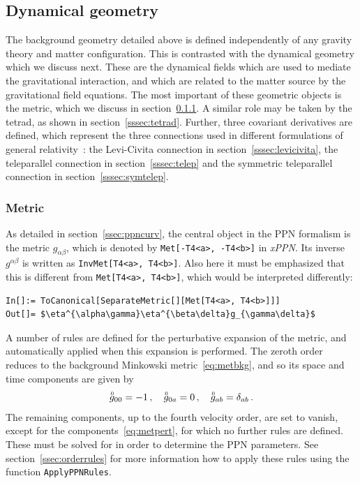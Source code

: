 \documentclass[notitlepage,a4paper,aps,prd,onecolumn,superscriptaddress,nofootinbib,groupedaddress,longbibliography]{revtex4-1}
\newcommand{\order}[2]{\accentset{#2}{#1}}
\newcommand{\xPPN}{\emph{xPPN}}
\begin{document}
\subsection{Dynamical geometry}\label{ssec:dyngeo}
The background geometry detailed above is defined independently of any gravity theory and matter configuration. This is contrasted with the dynamical geometry which we discuss next. These are the dynamical fields which are used to mediate the gravitational interaction, and which are related to the matter source by the gravitational field equations. The most important of these geometric objects is the metric, which we discuss in section~\ref{sssec:metric}. A similar role may be taken by the tetrad, as shown in section~\ref{sssec:tetrad}. Further, three covariant derivatives are defined, which represent the three connections used in different formulations of general relativity~\cite{BeltranJimenez:2019tjy}: the Levi-Civita connection in section~\ref{sssec:levicivita}, the teleparallel connection in section~\ref{sssec:telep} and the symmetric teleparallel connection in section~\ref{sssec:symtelep}.

\subsubsection{Metric}\label{sssec:metric}
As detailed in section~\ref{ssec:ppncurv}, the central object in the PPN formalism is the metric \(g_{\alpha\beta}\), which is denoted by \lstinline/Met[-T4<a>, -T4<b>]/ in \xPPN. Its inverse \(g^{\alpha\beta}\) is written as \lstinline/InvMet[T4<a>, T4<b>]/. Also here it must be emphasized that this is different from \lstinline/Met[T4<a>, T4<b>]/, which would be interpreted differently:
\begin{lstlisting}
In[]:= ToCanonical[SeparateMetric[][Met[T4<a>, T4<b>]]]
Out[]= $\eta^{\alpha\gamma}\eta^{\beta\delta}g_{\gamma\delta}$
\end{lstlisting}
A number of rules are defined for the perturbative expansion of the metric, and automatically applied when this expansion is performed. The zeroth order reduces to the background Minkowski metric~\eqref{eq:metbkg}, and so its space and time components are given by
\begin{equation}
\order{g}{0}_{00} = -1\,, \quad
\order{g}{0}_{0a} = 0\,, \quad
\order{g}{0}_{ab} = \delta_{ab}\,.
\end{equation}
The remaining components, up to the fourth velocity order, are set to vanish, except for the components~\eqref{eq:metpert}, for which no further rules are defined. These must be solved for in order to determine the PPN parameters. See section~\ref{ssec:orderrules} for more information how to apply these rules using the function \lstinline/ApplyPPNRules/.
\end{document}
